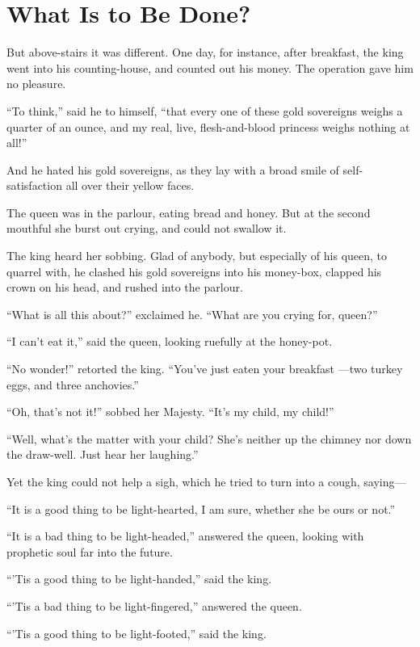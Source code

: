 \documentclass[12pt]{memoir}
\begin{document}
\chapter{What Is to Be Done?}


But above-stairs it was different.  One day, for instance, after
breakfast, the king went into his counting-house, and counted out his
money.  The operation gave him no pleasure.

``To think,'' said he to himself, ``that every one of these gold
sovereigns weighs a quarter of an ounce, and my real, live,
flesh-and-blood princess weighs nothing at all!''

And he hated his gold sovereigns, as they lay with a broad smile of
self-satisfaction all over their yellow faces.

The queen was in the parlour, eating bread and honey.  But at the
second mouthful she burst out crying, and could not swallow it.

The king heard her sobbing.  Glad of anybody, but especially of his
queen, to quarrel with, he clashed his gold sovereigns into his
money-box, clapped his crown on his head, and rushed into the parlour.

``What is all this about?'' exclaimed he.  ``What are you crying for,
queen?''

``I can't eat it,'' said the queen, looking ruefully at the honey-pot.

``No wonder!'' retorted the king.  ``You've just eaten your breakfast
---two turkey eggs, and three anchovies.''

``Oh, that's not it!'' sobbed her Majesty.  ``It's my child, my child!''

``Well, what's the matter with your child?  She's neither up the
chimney nor down the draw-well.  Just hear her laughing.''

Yet the king could not help a sigh, which he tried to turn into a
cough, saying---

``It is a good thing to be light-hearted, I am sure, whether she be
ours or not.''

``It is a bad thing to be light-headed,'' answered the queen, looking
with prophetic soul far into the future.

``'Tis a good thing to be light-handed,'' said the king.

``'Tis a bad thing to be light-fingered,'' answered the queen.

``'Tis a good thing to be light-footed,'' said the king.
\end{document}
